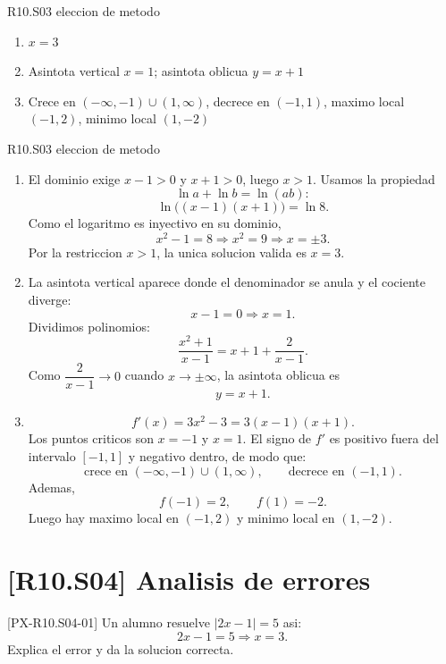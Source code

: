 \begin{shortanswer}{R10.S03 eleccion de metodo}
\begin{enumerate}[label=\textbf{PX-R10.S03-\arabic*:}, leftmargin=*]
  \item \(x=3\)
  \item Asintota vertical \(x=1\); asintota oblicua \(y=x+1\)
  \item Crece en \((-\infty,-1)\cup(1,\infty)\), decrece en \((-1,1)\), maximo local
  \((-1,2)\), minimo local \((1,-2)\)
\end{enumerate}
\end{shortanswer}

\begin{fullsolution}{R10.S03 eleccion de metodo}
\begin{enumerate}[label=\textbf{PX-R10.S03-\arabic*:}, leftmargin=*]
  \item El dominio exige \(x-1>0\) y \(x+1>0\), luego \(x>1\). Usamos la propiedad
  \[
  \ln a+\ln b=\ln(ab):
  \]
  \[
  \ln\bigl((x-1)(x+1)\bigr)=\ln 8.
  \]
  Como el logaritmo es inyectivo en su dominio,
  \[
  x^2-1=8 \Longrightarrow x^2=9 \Longrightarrow x=\pm 3.
  \]
  Por la restriccion \(x>1\), la unica solucion valida es \(x=3\).
  \item La asintota vertical aparece donde el denominador se anula y el cociente diverge:
  \[
  x-1=0 \Longrightarrow x=1.
  \]
  Dividimos polinomios:
  \[
  \frac{x^2+1}{x-1}=x+1+\frac{2}{x-1}.
  \]
  Como \(\dfrac{2}{x-1}\to 0\) cuando \(x\to \pm \infty\), la asintota oblicua es
  \[
  y=x+1.
  \]
  \item
  \[
  f'(x)=3x^2-3=3(x-1)(x+1).
  \]
  Los puntos criticos son \(x=-1\) y \(x=1\). El signo de \(f'\) es positivo fuera del
  intervalo \([-1,1]\) y negativo dentro, de modo que:
  \[
  \text{crece en }(-\infty,-1)\cup(1,\infty),\qquad
  \text{decrece en }(-1,1).
  \]
  Ademas,
  \[
  f(-1)=2,\qquad f(1)=-2.
  \]
  Luego hay maximo local en \((-1,2)\) y minimo local en \((1,-2)\).
\end{enumerate}
\end{fullsolution}

\section{[R10.S04] Analisis de errores}

\begin{exercise}{[PX-R10.S04-01] Un alumno resuelve \(|2x-1|=5\) asi:
\[
2x-1=5 \Longrightarrow x=3.
\]
Explica el error y da la solucion correcta.}
\end{exercise}

